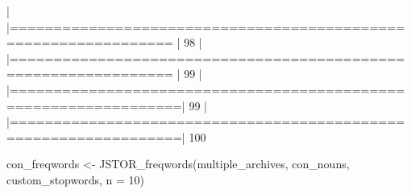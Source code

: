 \documentclass[10pt]{article}
\newenvironment{CodeChunk}{}{}
\begin{document}
\begin{CodeChunk}
\begin{CodeChunk}
\begin{CodeOutput}
  |                                                                       
  |================================================================ |  98%
  |                                                                       
  |================================================================ |  99%
  |                                                                       
  |=================================================================|  99%
  |                                                                       
  |=================================================================| 100%
\end{CodeOutput}
\begin{CodeInput}
con_freqwords <- JSTOR_freqwords(multiple_archives, con_nouns, custom_stopwords, n = 10)
\end{CodeInput}
\begin{CodeOutput}


\end{CodeOutput}
\end{CodeChunk}
\end{CodeChunk}
\end{document}
